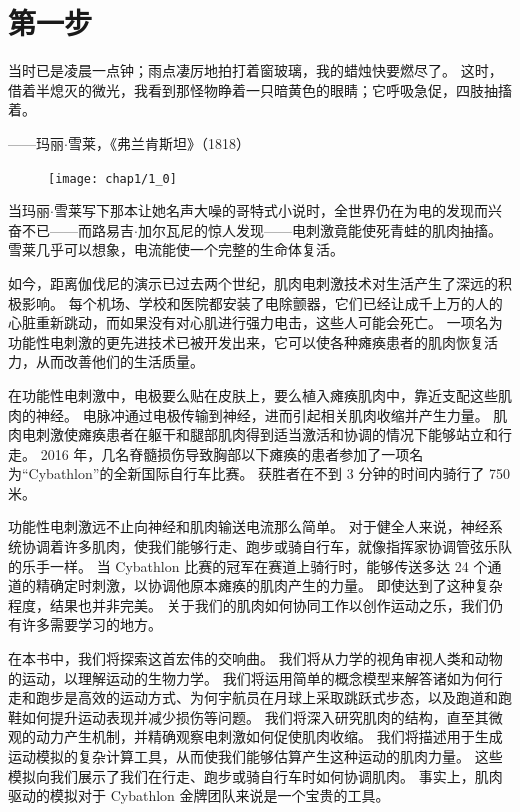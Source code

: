 

\chapter{第一步} \label{chap:chap1}

当时已是凌晨一点钟；雨点凄厉地拍打着窗玻璃，我的蜡烛快要燃尽了。
这时，借着半熄灭的微光，我看到那怪物睁着一只暗黄色的眼睛；它呼吸急促，四肢抽搐着。

\begin{flushright}
	——玛丽$\cdot$雪莱，《弗兰肯斯坦》（1818）\\
\end{flushright}


\begin{figure}[!htb]
	\centering
	\texttt{[image: chap1/1\_0]}
	\caption*{ \label{fig:1_0}}
\end{figure}

当玛丽$\cdot$雪莱写下那本让她名声大噪的哥特式小说时，全世界仍在为电的发现而兴奋不已——而路易吉$\cdot$加尔瓦尼的惊人发现——电刺激竟能使死青蛙的肌肉抽搐。
雪莱几乎可以想象，电流能使一个完整的生命体复活。


如今，距离伽伐尼的演示已过去两个世纪，肌肉电刺激技术对生活产生了深远的积极影响。
每个机场、学校和医院都安装了电除颤器，它们已经让成千上万的人的心脏重新跳动，而如果没有对心肌进行强力电击，这些人可能会死亡。
一项名为功能性电刺激的更先进技术已被开发出来，它可以使各种瘫痪患者的肌肉恢复活力，从而改善他们的生活质量。


在功能性电刺激中，电极要么贴在皮肤上，要么植入瘫痪肌肉中，靠近支配这些肌肉的神经。
电脉冲通过电极传输到神经，进而引起相关肌肉收缩并产生力量。
肌肉电刺激使瘫痪患者在躯干和腿部肌肉得到适当激活和协调的情况下能够站立和行走。
2016 年，几名脊髓损伤导致胸部以下瘫痪的患者参加了一项名为“Cybathlon”的全新国际自行车比赛。
获胜者在不到 3 分钟的时间内骑行了 750 米。


功能性电刺激远不止向神经和肌肉输送电流那么简单。
对于健全人来说，神经系统协调着许多肌肉，使我们能够行走、跑步或骑自行车，就像指挥家协调管弦乐队的乐手一样。
当 Cybathlon 比赛的冠军在赛道上骑行时，能够传送多达 24 个通道的精确定时刺激，以协调他原本瘫痪的肌肉产生的力量。
即使达到了这种复杂程度，结果也并非完美。
关于我们的肌肉如何协同工作以创作运动之乐，我们仍有许多需要学习的地方。


在本书中，我们将探索这首宏伟的交响曲。
我们将从力学的视角审视人类和动物的运动，以理解运动的生物力学。
我们将运用简单的概念模型来解答诸如为何行走和跑步是高效的运动方式、为何宇航员在月球上采取跳跃式步态，以及跑道和跑鞋如何提升运动表现并减少损伤等问题。
我们将深入研究肌肉的结构，直至其微观的动力产生机制，并精确观察电刺激如何促使肌肉收缩。
我们将描述用于生成运动模拟的复杂计算工具，从而使我们能够估算产生这种运动的肌肉力量。
这些模拟向我们展示了我们在行走、跑步或骑自行车时如何协调肌肉。
事实上，肌肉驱动的模拟对于 Cybathlon 金牌团队来说是一个宝贵的工具。


